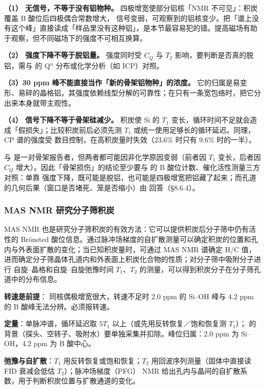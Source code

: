 \begin{pitfall}
\textbf{（1） 无信号，不等于没有铝物种。} 四极增宽使部分铝核「NMR 不可见」：积炭覆盖 B 酸位后四极偶合常数增大， 信号变弱，可观察到的铝核变少。把「谱上没有这个峰」直接读成「样品里没有这种铝」，是本节最容易犯的错。提高磁场有助于观察，但不同磁场下的强度不可相互换算。

\textbf{（2） 强度下降不等于脱铝量。} 强度同时受 $C_Q$ 与 $T_2$ 影响，要判断是否真的脱铝，需与  的 Q$^n$ 分布或化学分析（如 ICP）对照。

\textbf{（3）30 ppm 峰不能直接当作「新的骨架铝物种」的浓度。} 它的归属是易变形、易碎的晶格铝，其强度依赖线型分解的可靠性；在只有一条宽包络时，把它分出来本身就带主观性。

\textbf{（4） 信号下降不等于骨架硅减少。} 积炭使 Si 的 $T_1$ 变长，循环时间不足就会造成「假损失」；比较积炭前后必须先测 $T_1$ 或统一使用足够长的循环延迟。同理， CP 谱的强度受  数目控制，在高积炭量时失效（23.6\% 时只有 9.6\% 时的一半）。
\end{pitfall}

\begin{crosscheck}
 与  是一对骨架报告者，但两者都可能因非化学原因变弱（前者因 $T_1$ 变长，后者因 $C_Q$ 增大）。因此「骨架损伤」的结论至少要与  的 B 酸位计数、催化活性测量三方对照：单靠  强度下降，既可能是脱铝，也可能是四极增宽把铝藏了起来；而孔道的几何后果（窗口是否堵死、笼是否缩小）由  回答（§8.6.4）。
\end{crosscheck}

\subsubsection{ MAS NMR 研究分子筛积炭}

 MAS NMR 也是研究分子筛积炭的有效方法：它可以提供积炭后分子筛中仍有活性的 Brönsted 酸位信息。通过脉冲场梯度的自扩散测量可以确定积炭的位置和孔内与外表面扩散的变化；当已知积炭量时，可通过  MAS NMR 谱确定 H/C 值，进而确定分子筛晶体孔道内和外表面上积炭化合物的性质；对分子筛中吸附分子进行  自旋--晶格和自旋--自旋弛豫时间 $T_1$、$T_2$ 的测量，可以得到积炭分子在分子筛孔道中的分布信息。

\begin{measure}
\textbf{转速是前提}： 同核偶极增宽很大，转速不足时 2.0 ppm 的 Si--OH 峰与 4.2 ppm 的 B 酸峰无法分辨。必须报转速。

\textbf{定量}：单脉冲谱，循环延迟取 $5T_1$ 以上（或先用反转恢复／饱和恢复测 $T_1$）； 的背景（探头、空转子、吸附水）要单独采集并扣除。峰位归属：2.0 ppm 为 Si--OH，4.2 ppm 为 B 酸中心。

\textbf{弛豫与自扩散}：$T_1$ 用反转恢复或饱和恢复；$T_2$ 用回波序列测量（固体中直接读 FID 衰减会低估 $T_2$）；脉冲场梯度（PFG） NMR 给出孔内与晶间的自扩散系数，用于判断积炭位置与扩散通道的变化。
\end{measure}

